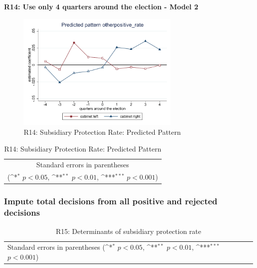 \documentclass[10pt,a4paper]{scrartcl}
\begin{document}
\clearpage
\textbf{R14: Use only 4 quarters around the election - Model 2}
\begin{figure}[!ht]
	\centering
	\includegraphics[width=0.7\textwidth]{figures_edited/otherpositive_rate_graph2_R14.pdf}
	\caption{R14: Subsidiary Protection Rate: Predicted Pattern}
\end{figure}

\begin{table}[!ht]\centering
	\footnotesize
	\renewcommand{\arraystretch}{1.2}
	\def\sym#1{\ifmmode^{#1}\else\(^{#1}\)\fi}
	\caption{R14: Subsidiary Protection Rate: Predicted Pattern}
	\begin{tabular}{l*{2}{c}}
		\hline\hline
		
		\hline\hline
		\multicolumn{3}{c}{\footnotesize Standard errors in parentheses} \\
		\multicolumn{3}{c}{\footnotesize (\sym{*} \(p<0.05\), \sym{**} \(p<0.01\), \sym{***} \(p<0.001\))} \\
	\end{tabular}
\end{table}





\clearpage
\FloatBarrier
\subsubsection{Impute total decisions from all positive and rejected decisions}
\begin{table}[!ht]\centering
	\renewcommand{\arraystretch}{1.25}
	\small
	\def\sym#1{\ifmmode^{#1}\else\(^{#1}\)\fi}
	\caption{R15: Determinants of subsidiary protection rate}
	\begin{tabular}{l*{3}{c}}
		\hline\hline
		
		\hline\hline
		\multicolumn{4}{l}{\footnotesize Standard errors in parentheses (\sym{*} \(p<0.05\), \sym{**} \(p<0.01\), \sym{***} \(p<0.001\))}\\
	\end{tabular}
\end{table}
\end{document}
